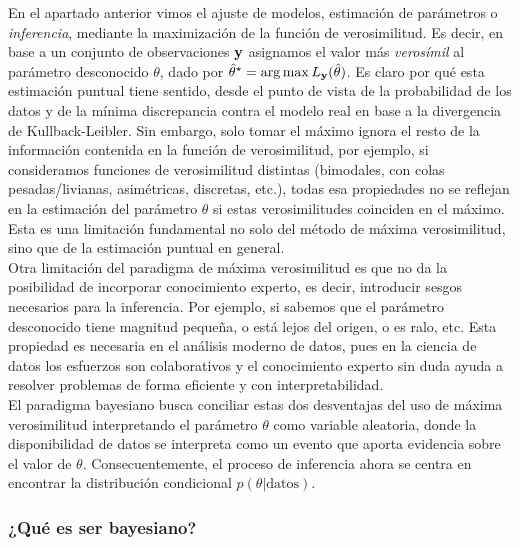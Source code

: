 En el apartado anterior vimos el ajuste de modelos, estimación de parámetros o \emph{inferencia}, mediante la maximización de la función de verosimilitud. Es decir, en base a un conjunto de observaciones $\mathbf{y}$ asignamos el valor más \emph{verosímil} al parámetro desconocido $\theta$, dado por $\hat\theta^\star = \arg\max  L_{\mathbf{y}}(\hat\theta)$. Es claro por qué esta estimación puntual tiene sentido, desde el punto de vista de la probabilidad de los datos y de la mínima discrepancia contra el modelo real en base a la  divergencia de Kullback-Leibler. Sin embargo, solo tomar el máximo ignora el resto de la información contenida en la función de verosimilitud, por ejemplo, si consideramos funciones de verosimilitud distintas (bimodales, con colas pesadas/livianas, asimétricas, discretas, etc.), todas esa propiedades no se reflejan en la estimación del parámetro $\theta$ si  estas verosimilitudes coinciden en el máximo. Esta es una limitación fundamental no solo del método de máxima verosimilitud, sino que de la estimación puntual en general. \\

Otra limitación del paradigma de máxima verosimilitud es que no da la posibilidad de incorporar conocimiento experto, es decir, introducir sesgos necesarios para la inferencia. Por ejemplo, si sabemos que el parámetro desconocido tiene magnitud pequeña, o está lejos del origen, o es ralo, etc. Esta propiedad es necesaria en el análisis moderno de datos, pues en la ciencia de datos los esfuerzos son colaborativos y el conocimiento experto sin duda ayuda a resolver problemas de forma eficiente y con interpretabilidad. \\

El paradigma bayesiano busca conciliar estas dos desventajas del uso de máxima verosimilitud interpretando el parámetro $\theta$ como variable aleatoria, donde la disponibilidad de datos se interpreta como un evento que aporta evidencia sobre el valor de $\theta$. Consecuentemente, el proceso de inferencia ahora se centra en encontrar la distribución condicional  $p(\theta|\text{datos})$.


\subsubsection{¿Qué es ser bayesiano?}
\label{ssub:que_es_bayes}

